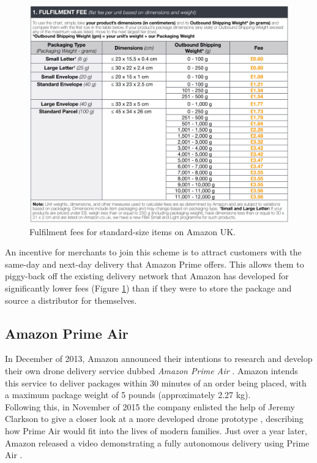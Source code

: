\documentclass[a4paper,11pt,titlepage]{report}
\begin{document}
\begin{figure}[!hbpt]
  \center
  \includegraphics[width=0.9\linewidth]{img/fulfilled_by_amazon_table.png}
  \caption{Fulfilment fees for standard-size items on Amazon UK. \cite{Channel2017}}
  \label{fig:fulfilled_by_amazon_table}
\end{figure}

\newpage
An incentive for merchants to join this scheme is to attract customers with the same-day and next-day delivery that Amazon Prime offers. This allows them to piggy-back off the existing delivery network that Amazon has developed for significantly lower fees (Figure \ref{fig:fulfilled_by_amazon_table}) than if they were to store the package and source a distributor for themselves.

\subsection{Amazon Prime Air}
In December of 2013, Amazon announced their intentions to research and develop their own drone delivery service dubbed \textit{Amazon Prime Air} \cite{Amazon.comInc.2013}. Amazon intends this service to deliver packages within 30 minutes of an order being placed, with a maximum package weight of 5 pounds (approximately 2.27 kg).\\

Following this, in November of 2015 the company enlisted the help of Jeremy Clarkson to give a closer look at a more developed drone prototype \cite{Amazon.comInc.2015b}, describing how Prime Air would fit into the lives of modern families. Just over a year later, Amazon released a video demonstrating a fully autonomous delivery using Prime Air \cite{Amazon.comInc.2016}.
\end{document}
